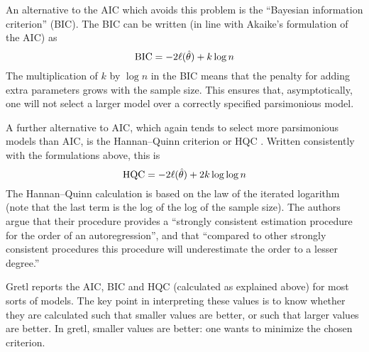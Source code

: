 An alternative to the AIC which avoids this problem is the
\cite{schwarz78} ``Bayesian information criterion'' (BIC).  The BIC
can be written (in line with Akaike's formulation of the AIC) as
%
\[
{\rm BIC} = -2 \ell(\hat{\theta}) + k \log n
\]
The multiplication of $k$ by $\log n$ in the BIC means that the
penalty for adding extra parameters grows with the sample size.  This
ensures that, asymptotically, one will not select a larger model over
a correctly specified parsimonious model.

A further alternative to AIC, which again tends to select more
parsimonious models than AIC, is the Hannan--Quinn criterion or HQC
\citep{hannan-quinn79}.  Written consistently with the formulations
above, this is
%
\[
{\rm HQC} = -2 \ell(\hat{\theta}) + 2k \log \log n
\]
%
The Hannan--Quinn calculation is based on the law of the iterated
logarithm (note that the last term is the log of the log of the sample
size).  The authors argue that their procedure provides a ``strongly
consistent estimation procedure for the order of an autoregression'',
and that ``compared to other strongly consistent procedures this
procedure will underestimate the order to a lesser degree.''

\vspace{1ex}

Gretl reports the AIC, BIC and HQC (calculated as explained above) for
most sorts of models.  The key point in interpreting these values is
to know whether they are calculated such that smaller values are
better, or such that larger values are better.  In gretl, smaller
values are better: one wants to minimize the chosen criterion.




